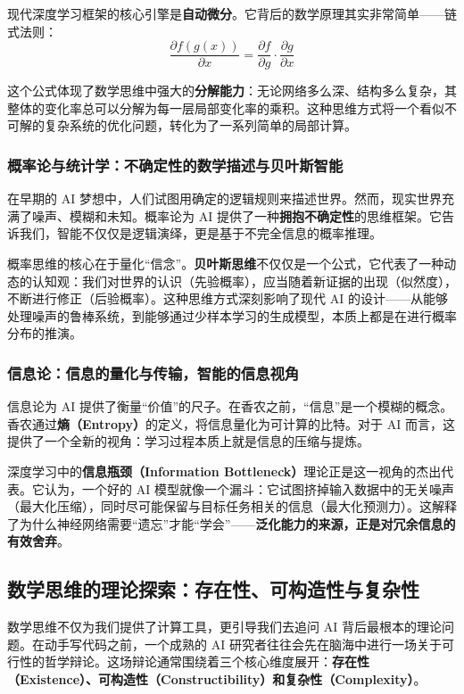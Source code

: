 现代深度学习框架的核心引擎是\textbf{自动微分}。它背后的数学原理其实非常简单——链式法则：
$$\frac{\partial f(g(x))}{\partial x} = \frac{\partial f}{\partial g} \cdot \frac{\partial g}{\partial x}$$

这个公式体现了数学思维中强大的\textbf{分解能力}：无论网络多么深、结构多么复杂，其整体的变化率总可以分解为每一层局部变化率的乘积。这种思维方式将一个看似不可解的复杂系统的优化问题，转化为了一系列简单的局部计算。

\subsubsection{概率论与统计学：不确定性的数学描述与贝叶斯智能}

在早期的 AI 梦想中，人们试图用确定的逻辑规则来描述世界。然而，现实世界充满了噪声、模糊和未知。概率论为 AI 提供了一种\textbf{拥抱不确定性}的思维框架。它告诉我们，智能不仅仅是逻辑演绎，更是基于不完全信息的概率推理。

概率思维的核心在于量化“信念”。\textbf{贝叶斯思维}不仅仅是一个公式，它代表了一种动态的认知观：我们对世界的认识（先验概率），应当随着新证据的出现（似然度），不断进行修正（后验概率）。这种思维方式深刻影响了现代 AI 的设计——从能够处理噪声的鲁棒系统，到能够通过少样本学习的生成模型，本质上都是在进行概率分布的推演。

\subsubsection{信息论：信息的量化与传输，智能的信息视角}

信息论为 AI 提供了衡量“价值”的尺子。在香农之前，“信息”是一个模糊的概念。香农通过\textbf{熵（Entropy）}的定义，将信息量化为可计算的比特。对于 AI 而言，这提供了一个全新的视角：学习过程本质上就是信息的压缩与提炼。

深度学习中的\textbf{信息瓶颈（Information Bottleneck）}理论正是这一视角的杰出代表。它认为，一个好的 AI 模型就像一个漏斗：它试图挤掉输入数据中的无关噪声（最大化压缩），同时尽可能保留与目标任务相关的信息（最大化预测力）。这解释了为什么神经网络需要“遗忘”才能“学会”——\textbf{泛化能力的来源，正是对冗余信息的有效舍弃}。

\subsection{数学思维的理论探索：存在性、可构造性与复杂性}

数学思维不仅为我们提供了计算工具，更引导我们去追问 AI 背后最根本的理论问题。在动手写代码之前，一个成熟的 AI 研究者往往会先在脑海中进行一场关于可行性的哲学辩论。这场辩论通常围绕着三个核心维度展开：\textbf{存在性（Existence）、可构造性（Constructibility）和复杂性（Complexity）}。

